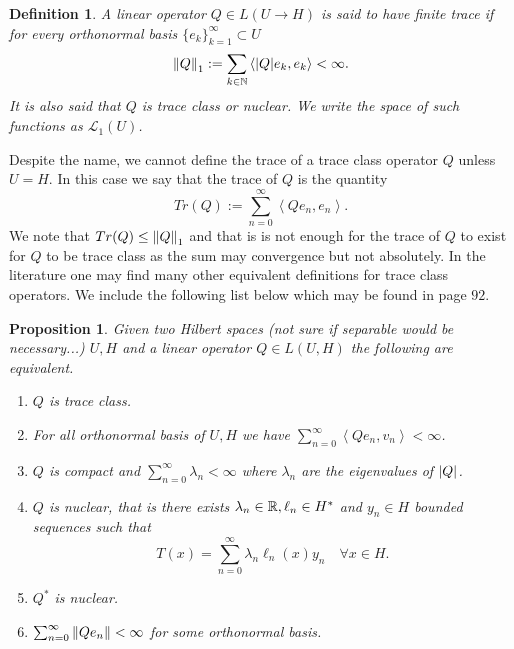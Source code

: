 \documentclass[12pt]{article}
\newtheorem{proposition}{Proposition}
\newtheorem{definition}{Definition}
\newcommand{\br}[1]{\left\langle#1\right\rangle}
\begin{document}
\begin{definition}
	A linear operator $Q\in L(U\to H)$ is said to have finite trace if for every orthonormal basis $\{e_k\}_{k=1}^\infty \subset  U$
	\begin{equation*}
		\norm{Q}_1:=\sum_{k\in\mathbb{N}}\br{\abs{Q}e_k,e_k}<\infty.
	\end{equation*}
	It is also said that $Q$ is trace class or nuclear. We write the space of such functions as $\mathcal{L}_1(U)$.
\end{definition}
Despite the name, we cannot define the trace of a trace class operator $Q$ unless  $U=H$. In this case we say that the trace of $Q$ is the quantity
\begin{equation*}
	Tr(Q):=\sum_{n=0}^{\infty} \br{Q e_n,e_n}.
\end{equation*}
We note that $Tr(Q)\leq \norm{Q}_1$ and that is is not enough for the trace of $Q$ to exist for $Q$ to be trace class as the sum may convergence but not absolutely. In the literature one may find many other equivalent definitions for trace class operators. We include the following list below which may be found in \cite{lototsky2017stochastic} page $92$.
\begin{proposition} Given two Hilbert spaces (not sure if separable would be necessary...) $U,H$ and a linear operator  $Q\in L(U,H)$ the following are equivalent.
	\begin{enumerate}
		\item $Q$ is trace class.
		\item For all orthonormal basis of $U,H$ we have $\sum_{n=0}^{\infty} \br{Qe_n,v_n}<\infty$.
		\item $Q$ is compact and  $\sum_{n=0}^{\infty} \lambda _n<\infty$ where $\lambda _n$ are the eigenvalues of $\abs{Q}$.
		\item $Q$ is nuclear, that is there exists  $\lambda _n \in {\mathbb R},\ell_n \in H^*$ and $y_n \in H$ bounded sequences such that
		      \begin{equation*}
			      T(x)=\sum_{n=0}^{\infty} \lambda _n\ell_n(x)y_n \quad\forall x\in H.
		      \end{equation*}
		\item $Q^*$ is nuclear.
		\item $\sum_{n=0}^{\infty} \norm{Qe_n}<\infty$ for some orthonormal basis.

	\end{enumerate}
\end{proposition}
\end{document}
